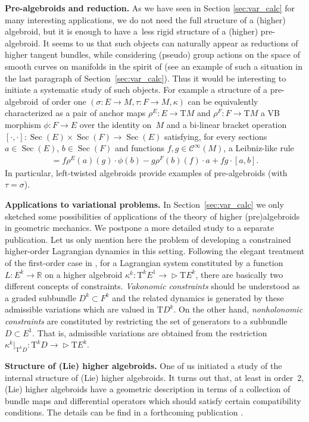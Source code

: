 \documentclass[pdftex]{sigma}
\newcommand{\degree}{{order}}
\newcommand{\R}{\mathbb{R}}
\newcommand{\Sec}{\operatorname{Sec}}
\newcommand{\ra}{\rightarrow}
\newcommand{\prealg}{pre-algebroid} %
\newcommand{\Prealg}{Pre-algebroid}
\newcommand{\T}{\mathrm{T}} %
\newcommand{\Cf}{\mathcal{C}^\infty}
\def\relto{\rightarrow\!\!\vartriangleright} %
\numberwithin{equation}{section}
\theoremstyle{definition}
\begin{document}
{\bf \Prealg s and reduction.} As we have seen in Section \ref{sec:var_calc} for many interesting applications, we do not need the full structure of a (higher) algebroid, but it is enough to have a~less rigid structure of a (higher) \prealg . It seems to us that such objects can na\-tu\-rally appear as reductions of higher tangent bundles, while considering (pseudo) group actions on the space of smooth curves on manifolds in the spirit of \cite{Kruglikov_Lychagin_2015} (see an example of such a situation in the last paragraph of Section~\ref{sec:var_calc}). Thus it would be interesting to ini\-tiate a systematic study of such objects. For example a structure of a \prealg\ of order one $(\sigma\colon E\ra M, \tau\colon F\ra M, \kappa)$ can be equivalently characterized as a pair of anchor maps $\rho^E\colon E\ra \T M $ and $\rho^F\colon F\ra \T M$ a VB morphism $\phi\colon F\ra E$ over the identity on~$M$ and a bi-linear bracket operation $[\cdot, \cdot]\colon \Sec(E)\times \Sec(F)\ra \Sec(E)$ satisfying, for every sections $a\in\Sec(E)$, $b\in\Sec(F)$ and functions $f,g\in\Cf(M)$, a Leibniz-like rule
\begin{gather*}[f\cdot a,g\cdot b]=f\rho^E(a)(g)\cdot\phi(b)-g\rho^F(b)(f)\cdot a+fg\cdot[a,b].\end{gather*}
In particular, left-twisted algebroids provide examples of \prealg s (with $\tau=\sigma$).

{\bf Applications to variational problems.} In Section~\ref{sec:var_calc} we only sketched some possibilities of applications of the theory of higher (pre)algebroids in geometric mechanics. We postpone a more detailed study to a separate publication. Let us only mention here the problem of developing a constrained higher-order Lagrangian dynamics in this setting. Following the elegant treatment of the first-order case in \cite{GG_var_calc_gen_alg_2008}, for a Lagrangian system constituted by a function $L\colon E^k\ra\R$ on a higher algebroid $\kappa^k\colon \T^k E^1\relto \T E^k$, there are basically two different concepts of constraints. \emph{Vakonomic constraints} should be understood as a graded subbundle $D^k\subset F^k$ and the related dynamics is generated by these admissible variations which are valued in $\T D^k$. On the other hand, \emph{nonholonomic constraints} are constituted by restricting the set of generators to a subbundle $D\subset E^1$. That is, admissible variations are obtained from the restriction $\kappa^k|_{\T^k D}\colon \T^k D\relto \T E^k$.

{\bf Structure of (Lie) higher algebroids.} One of us initiated a study of the internal structure of (Lie) higher algebroids. It turns out that, at least in \degree\ 2, (Lie) higher algebroids have a geometric description in terms of a collection of bundle maps and differential operators which should satisfy certain compatibility conditions. The details can be find in a forthcoming publication \cite{Rotkiewicz_aha}.
\end{document}
